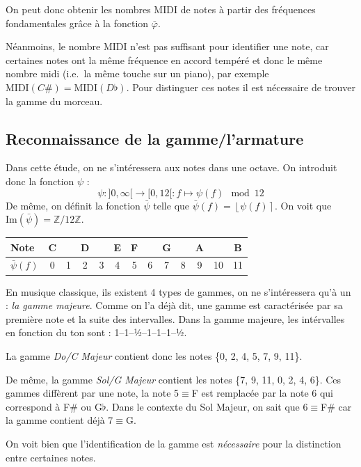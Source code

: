 \documentclass[french,]{article}
\begin{document}
On peut donc obtenir les nombres MIDI de notes à partir des fréquences
fondamentales grâce à la fonction \(\bar{\varphi}\).

Néanmoins, le nombre MIDI n'est pas suffisant pour identifier une note,
car certaines notes ont la même fréquence en accord tempéré et donc le
même nombre midi (i.e.~la même touche sur un piano), par exemple
\(\text{MIDI}(C\#)=\text{MIDI}(D\flat)\). Pour distinguer ces notes il
est nécessaire de trouver la gamme du morceau.

\hypertarget{reconnaissance-de-la-gammelarmature}{%
\subsection{Reconnaissance de la
gamme/l'armature}\label{reconnaissance-de-la-gammelarmature}}

Dans cette étude, on ne s'intéressera aux notes dans une octave. On
introduit donc la fonction \(\psi\) :
\[\psi: ]0,\infty[ \rightarrow [0,12[ : f \mapsto \psi(f) \mod 12\] De
même, on définit la fonction \(\bar{\psi}\) telle que
\(\bar{\psi}(f)=\left\lfloor\psi(f)\right\rceil\). On voit que
\(\mathrm{Im}(\bar{\psi})=\mathbb{Z}/12\mathbb{Z}\).

\vspace{-1em}

\begin{longtable}[]{@{}lcccccccccccc@{}}
\toprule
Note & C & & D & & E & F & & G & & A & & B\tabularnewline
\midrule
\endhead
\(\bar{\psi}(f)\) & 0 & 1 & 2 & 3 & 4 & 5 & 6 & 7 & 8 & 9 & 10 &
11\tabularnewline
\bottomrule
\end{longtable}

En musique classique, ils existent 4 types de gammes, on ne
s'intéressera qu'à un : \emph{la gamme majeure}. Comme on l'a déjà dit,
une gamme est caractérisée par sa première note et la suite des
intervalles. Dans la gamme majeure, les intérvalles en fonction du ton
sont : 1--1--½--1--1--1--½.

La gamme \emph{Do/C Majeur} contient donc les notes \{0, 2, 4, 5, 7, 9,
11\}.

De même, la gamme \emph{Sol/G Majeur} contient les notes \{7, 9, 11, 0,
2, 4, 6\}. Ces gammes diffèrent par une note, la note 5\(\equiv\)F est
remplacée par la note 6 qui correspond à F\# ou G\(\flat\). Dans le
contexte du Sol Majeur, on sait que 6\(\equiv\)F\# car la gamme contient
déjà 7\(\equiv\)G.

On voit bien que l'identification de la gamme est \emph{nécessaire} pour
la distinction entre certaines notes.
\end{document}
